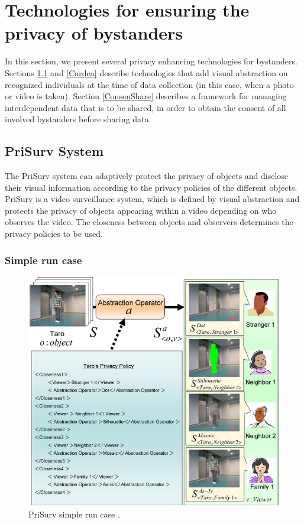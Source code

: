 \documentclass[conference]{IEEEtran}
\begin{document}
\section{Technologies for ensuring the privacy of bystanders}\label{Technologies}
In this section, we present several privacy enhancing technologies for bystanders. Sections \ref{PrivSurv} and \ref{Cardea} describe technologies that add visual abstraction on recognized individuals at the time of data collection (in this case, when a photo or video is taken). Section \ref{ConsenShare} describes a framework for managing interdependent data that is to be shared, in order to obtain the consent of all involved bystanders before sharing data.

\subsection{PriSurv System}\label{PrivSurv}
The PriSurv system \cite{chinomi2008PriSurv} can adaptively protect the privacy of objects and disclose their visual information according to the privacy policies of the different objects. PriSurv is a video surveillance system, which is defined by visual abstraction and protects the privacy of objects appearing within a video depending on who observes the video. The closeness between objects and observers determines the privacy policies to be used. 

\subsubsection{Simple run case}

\begin{figure}[t]
\centerline{\includegraphics[width=.5\textwidth]{img//prisurv_simple_demo.png}}
\caption{PriSurv simple run case \cite{chinomi2008PriSurv}.}
\label{fig:prisurv}
\end{figure}
\end{document}
